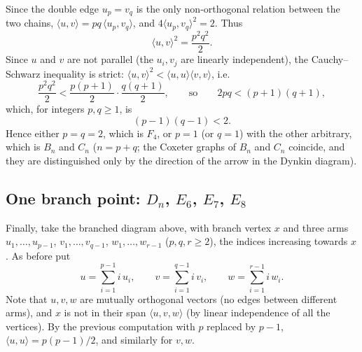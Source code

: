 \documentclass[11pt,openany]{book}
\theoremstyle{plain}
\theoremstyle{definition}
\theoremstyle{remark}
\newcommand{\added}[1]{{\color{addcol}#1}}
\newcommand{\ip}[2]{\langle #1, #2\rangle}
\begin{document}
Since the double edge $u_p = v_q$ is the only non-orthogonal relation between the two chains,
$\ip{u}{v} = pq\,\ip{u_p}{v_q}$, and $4\ip{u_p}{v_q}^2=2$. Thus
\[
  \ip{u}{v}^2 = \frac{p^2q^2}{2}.
\]
Since $u$ and $v$ are not parallel \added{(the $u_i, v_j$ are linearly independent)}, the
Cauchy--Schwarz inequality is strict: $\ip{u}{v}^2 < \ip{u}{u}\ip{v}{v}$, i.e.
\[
  \frac{p^2q^2}{2} < \frac{p(p+1)}{2}\cdot\frac{q(q+1)}{2},
  \qquad\text{so}\qquad 2pq < (p+1)(q+1),
\]
which, for integers $p,q\ge 1$, is
\[
  \boxed{(p-1)(q-1) < 2.}
\]
Hence either $p=q=2$, which is $F_4$, or $p=1$ (or $q=1$) with the other arbitrary, which is
$B_n$ and $C_n$ \added{($n=p+q$; the Coxeter graphs of $B_n$ and $C_n$ coincide, and they are
distinguished only by the direction of the arrow in the Dynkin diagram)}.

\subsection{One branch point: \texorpdfstring{$D_n$, $E_6$, $E_7$, $E_8$}{Dn, E6, E7, E8}}

Finally, take the branched diagram above, with branch vertex $x$ and three arms
$u_1,\dots,u_{p-1}$, $v_1,\dots,v_{q-1}$, $w_1,\dots,w_{r-1}$ ($p,q,r\ge 2$), the indices
increasing towards $x$. As before put
\[
  u=\sum_{i=1}^{p-1} i\,u_i,\qquad v=\sum_{i=1}^{q-1} i\,v_i,\qquad w=\sum_{i=1}^{r-1} i\,w_i .
\]
Note that $u,v,w$ are mutually orthogonal vectors (no edges between different arms), and
$x$ is not in their span $\langle u,v,w\rangle$ \added{(by linear independence of all the vertices)}.
By the previous computation with $p$ replaced by $p-1$,
$\ip{u}{u} = p(p-1)/2$, and similarly for $v,w$.
\end{document}
